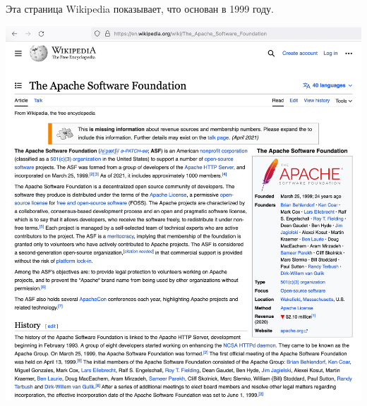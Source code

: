 
Эта страница Wikipedia показывает, что \Asf основан в 1999 году.

\includegraphics[width=\textwidth]{wikipedia}

\pagebreak
